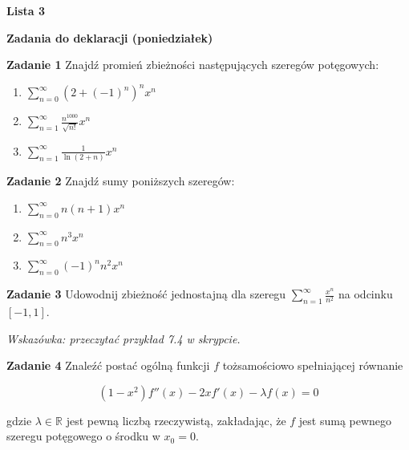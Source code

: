 \documentclass[a4paper,11pt]{article}
\begin{document}
\begin{center}
  {\large\textbf{Lista 3}}
\end{center}

\hrulefill
\begin{center}
    \textbf{Zadania do deklaracji (poniedziałek)}
\end{center}

\bigskip

\textbf{Zadanie 1} Znajdź promień zbieżności 
następujących szeregów potęgowych:

\begin{multicols}{3}
    \begin{enumerate}
        \item $\sum_{n=0}^\infty (2+(-1)^n)^n x^n$
        \item $\sum_{n=1}^\infty \frac{n^{1000}}{\sqrt{n!}}x^n$
        \item $\sum_{n=1}^\infty \frac{1}{\ln(2+n)}x^n$
    \end{enumerate}
\end{multicols}

\bigskip

\textbf{Zadanie 2} Znajdź sumy poniższych szeregów:

\begin{multicols}{3}
    \begin{enumerate}
        \item $\sum_{n=0}^\infty n(n+1) x^n$
        \item $\sum_{n=0}^\infty n^3 x^n$
        \item $\sum_{n=0}^\infty (-1)^{n} n^2 x^n$
    \end{enumerate}
\end{multicols}

\bigskip

\textbf{Zadanie 3} Udowodnij zbieżność jednostajną dla szeregu $\sum_{n=1}^\infty \frac{x^n}{n^2}$ na odcinku $[-1,1]$.

\textit{Wskazówka: przeczytać przykład 7.4 w skrypcie.}

\bigskip

\textbf{Zadanie 4} Znaleźć postać ogólną funkcji $f$ tożsamościowo
spełniającej równanie

\[
(1-x^2) f''(x) - 2xf'(x) - \lambda f(x) = 0
\]

gdzie $\lambda \in \mathbb{R}$ jest pewną liczbą rzeczywistą, zakładając, 
że $f$ jest sumą pewnego szeregu potęgowego o środku w $x_0 = 0$. \\
\end{document}
